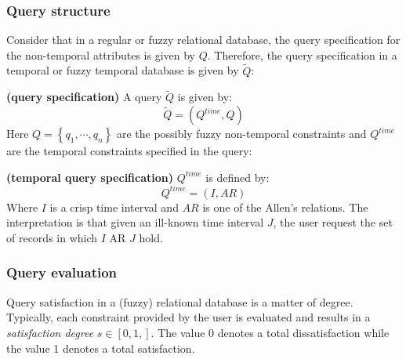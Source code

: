 \subsubsection{Query structure}
Consider that in a regular or fuzzy relational database, the query specification for the non-temporal attributes is given by $Q$. Therefore, the query specification in a temporal or fuzzy temporal database is given by $\tilde{Q}$:

\begin{definition}
\textbf{(query specification)}
A query $\tilde{Q}$ is given by:
\begin{equation}
\label{eq:query-specification}
\tilde{Q} = \left( Q^{time}, Q \right)
\end{equation}
Here $Q = \left \lbrace q_1, \cdots, q_n \right \rbrace$ are the possibly fuzzy non-temporal constraints and $Q^{time}$ are the temporal constraints specified in the query:
\end{definition}



\begin{definition}
\textbf{(temporal query specification)}
$Q^{time}$ is defined by:
\begin{equation}
Q^{time} = \left( I,AR \right)
\end{equation}
Where $I$ is a crisp time interval and $AR$ is one of the Allen's relations. The interpretation is that given an ill-known time interval $J$, the user request the set of records in which $I$ AR $J$ hold.
\end{definition}

\subsubsection{Query evaluation}
\label{subsubsec:query-evaluation}
Query satisfaction in a (fuzzy) relational database is a matter of degree. Typically, each constraint provided by the user is evaluated and results in a \emph{satisfaction degree} $s \in \left[ 0,1,\right]$. The value 0 denotes a total dissatisfaction while the value 1 denotes a total satisfaction.


